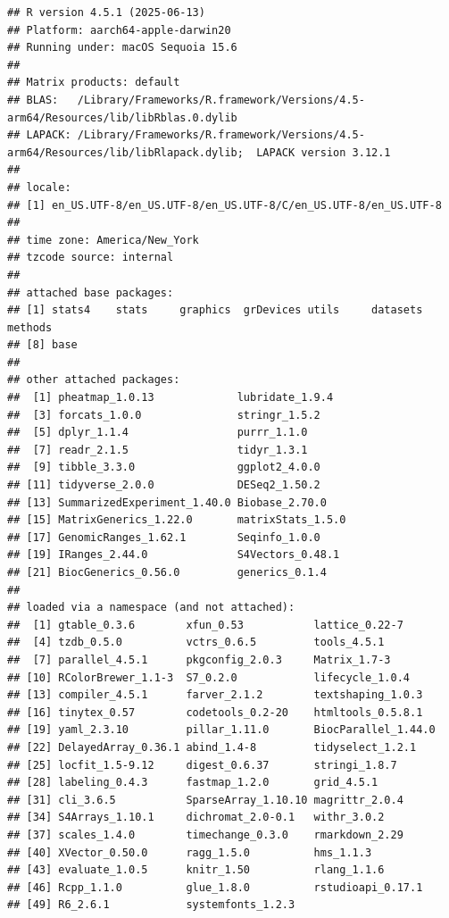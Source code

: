 \documentclass[
]{article}
\begin{document}
\begin{verbatim}
## R version 4.5.1 (2025-06-13)
## Platform: aarch64-apple-darwin20
## Running under: macOS Sequoia 15.6
## 
## Matrix products: default
## BLAS:   /Library/Frameworks/R.framework/Versions/4.5-arm64/Resources/lib/libRblas.0.dylib 
## LAPACK: /Library/Frameworks/R.framework/Versions/4.5-arm64/Resources/lib/libRlapack.dylib;  LAPACK version 3.12.1
## 
## locale:
## [1] en_US.UTF-8/en_US.UTF-8/en_US.UTF-8/C/en_US.UTF-8/en_US.UTF-8
## 
## time zone: America/New_York
## tzcode source: internal
## 
## attached base packages:
## [1] stats4    stats     graphics  grDevices utils     datasets  methods  
## [8] base     
## 
## other attached packages:
##  [1] pheatmap_1.0.13             lubridate_1.9.4            
##  [3] forcats_1.0.0               stringr_1.5.2              
##  [5] dplyr_1.1.4                 purrr_1.1.0                
##  [7] readr_2.1.5                 tidyr_1.3.1                
##  [9] tibble_3.3.0                ggplot2_4.0.0              
## [11] tidyverse_2.0.0             DESeq2_1.50.2              
## [13] SummarizedExperiment_1.40.0 Biobase_2.70.0             
## [15] MatrixGenerics_1.22.0       matrixStats_1.5.0          
## [17] GenomicRanges_1.62.1        Seqinfo_1.0.0              
## [19] IRanges_2.44.0              S4Vectors_0.48.1           
## [21] BiocGenerics_0.56.0         generics_0.1.4             
## 
## loaded via a namespace (and not attached):
##  [1] gtable_0.3.6        xfun_0.53           lattice_0.22-7     
##  [4] tzdb_0.5.0          vctrs_0.6.5         tools_4.5.1        
##  [7] parallel_4.5.1      pkgconfig_2.0.3     Matrix_1.7-3       
## [10] RColorBrewer_1.1-3  S7_0.2.0            lifecycle_1.0.4    
## [13] compiler_4.5.1      farver_2.1.2        textshaping_1.0.3  
## [16] tinytex_0.57        codetools_0.2-20    htmltools_0.5.8.1  
## [19] yaml_2.3.10         pillar_1.11.0       BiocParallel_1.44.0
## [22] DelayedArray_0.36.1 abind_1.4-8         tidyselect_1.2.1   
## [25] locfit_1.5-9.12     digest_0.6.37       stringi_1.8.7      
## [28] labeling_0.4.3      fastmap_1.2.0       grid_4.5.1         
## [31] cli_3.6.5           SparseArray_1.10.10 magrittr_2.0.4     
## [34] S4Arrays_1.10.1     dichromat_2.0-0.1   withr_3.0.2        
## [37] scales_1.4.0        timechange_0.3.0    rmarkdown_2.29     
## [40] XVector_0.50.0      ragg_1.5.0          hms_1.1.3          
## [43] evaluate_1.0.5      knitr_1.50          rlang_1.1.6        
## [46] Rcpp_1.1.0          glue_1.8.0          rstudioapi_0.17.1  
## [49] R6_2.6.1            systemfonts_1.2.3
\end{verbatim}
\end{document}
